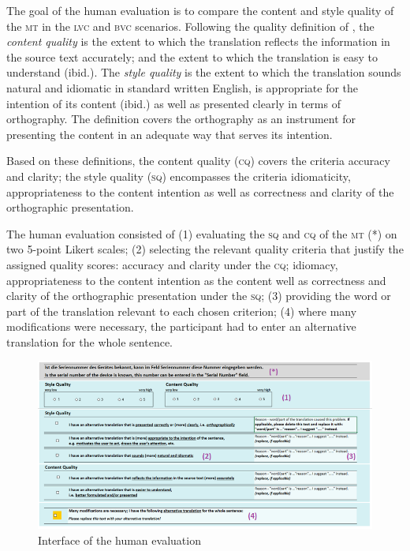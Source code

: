 \documentclass[output=paper]{langsci/langscibook}
\begin{document}
The goal of the human evaluation is to compare the content and style quality of the \textsc{mt} in the \textsc{lvc} and \textsc{bvc} scenarios. Following the quality definition of \citet{Hutchins1992}, the \textit{content quality} is the extent to which the translation reflects the information in the source text accurately; and the extent to which the translation is easy to understand (ibid.). The \textit{style quality} is the extent to which the translation sounds natural and idiomatic in standard written English, is appropriate for the intention of its content (ibid.) as well as presented clearly in terms of orthography. The definition covers the orthography as an instrument for presenting the content in an adequate way that serves its intention. 

Based on these definitions, the content quality (\textsc{cq}) covers the criteria accuracy and clarity; the style quality (\textsc{sq}) encompasses the criteria idiomaticity, appropriateness to the content intention as well as correctness and clarity of the orthographic presentation. 

The human evaluation  consisted of
(1) evaluating the \textsc{sq} and \textsc{cq} of the \textsc{mt} (*) on two 5-point Likert scales;
(2) selecting the relevant quality criteria that justify the assigned quality scores: accuracy and clarity under the \textsc{cq}; idiomacy, appropriateness to the content intention as the content well as correctness and clarity of the orthographic presentation under the \textsc{sq};
(3) providing the word or part of the translation relevant to each chosen criterion; (4) where many modifications were necessary, the participant had to enter an alternative translation for the whole sentence.


\begin{figure}
	\includegraphics[width=\textwidth]{figures/figure1.png}
    \caption{Interface of the human evaluation}
    \label{marzouk:fig1}
\end{figure}
\end{document}
